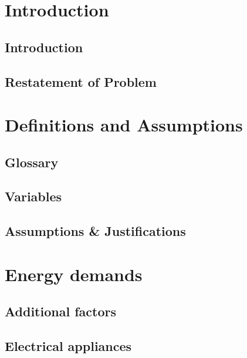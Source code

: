 \documentclass[12pt]{article}
\begin{document}


\tableofcontents
\newpage

\section{Introduction}
\subsection{Introduction}

\subsection{Restatement of Problem}


\section{Definitions and Assumptions}
\subsection{Glossary}

\subsection{Variables}

\subsection{Assumptions \& Justifications}


\section{Energy demands}
\subsection{Additional factors}

\subsection{Electrical appliances}


\end{document}
